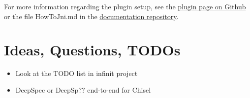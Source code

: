 \documentclass[conference]{IEEEtran}
\begin{document}
For more information regarding the plugin setup, see the \href{https://github.com/jodersky/sbt-jni}{plugin page on Github} or the file HowToJni.md in the \href{https://github.com/chisel-uvm/documentation}{documentation repository}.





%



\section{Ideas, Questions, TODOs}



\begin{itemize}
\item Look at the TODO list in infinit project
\item DeepSpec or DeepSp?? end-to-end for Chisel
\end{itemize}
\end{document}
